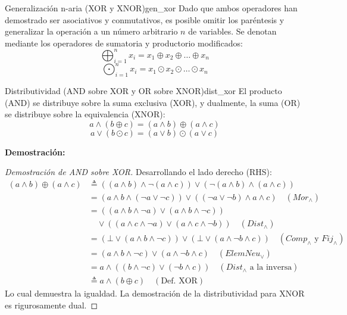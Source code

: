 \documentclass[12pt,a4paper]{article}
\newcommand{\desplegable}[2]{%
  \par\vspace{1ex}\noindent
  \textbf{Demostración:}
  \vspace{1ex}
  
  #2
  \par\vspace{1ex}
}
\begin{document}
\begin{teorema}{Generalización n-aria (XOR y XNOR)}{gen_xor}
Dado que ambos operadores han demostrado ser asociativos y conmutativos, es posible omitir los paréntesis y generalizar la operación a un número arbitrario $n$ de variables. Se denotan mediante los operadores de sumatoria y productorio modificados:
\[ \bigoplus_{i=1}^{n} x_i = x_1 \oplus x_2 \oplus \dots \oplus x_n \]
\[ \bigodot_{i=1}^{n} x_i = x_1 \odot x_2 \odot \dots \odot x_n \]
\end{teorema}

\begin{teorema}{Distributividad (AND sobre XOR y OR sobre XNOR)}{dist_xor}
El producto (AND) se distribuye sobre la suma exclusiva (XOR), y dualmente, la suma (OR) se distribuye sobre la equivalencia (XNOR):
\[ a \wedge (b \oplus c) = (a \wedge b) \oplus (a \wedge c) \]
\[ a \vee (b \odot c) = (a \vee b) \odot (a \vee c) \]
\end{teorema}
\desplegable{proof_dist_xor}{
\begin{proof}[Demostración de AND sobre XOR]
Desarrollando el lado derecho (RHS):
\begin{align*}
    (a \wedge b) \oplus (a \wedge c) &\triangleq ((a \wedge b) \wedge \neg(a \wedge c)) \vee (\neg(a \wedge b) \wedge (a \wedge c)) \\
                                     &= (a \wedge b \wedge (\neg a \vee \neg c)) \vee ((\neg a \vee \neg b) \wedge a \wedge c) \quad (Mor_\wedge) \\
                                     &= ((a \wedge b \wedge \neg a) \vee (a \wedge b \wedge \neg c)) \\
                                     &\quad \vee ((a \wedge c \wedge \neg a) \vee (a \wedge c \wedge \neg b)) \quad (Dist_\wedge) \\
                                     &= (\bot \vee (a \wedge b \wedge \neg c)) \vee (\bot \vee (a \wedge \neg b \wedge c)) \quad (Comp_\wedge \text{ y } Fij_\wedge) \\
                                     &= (a \wedge b \wedge \neg c) \vee (a \wedge \neg b \wedge c) \quad (ElemNeu_\vee) \\
                                     &= a \wedge ((b \wedge \neg c) \vee (\neg b \wedge c)) \quad (Dist_\wedge \text{ a la inversa}) \\
                                     &\triangleq a \wedge (b \oplus c) \quad (\text{Def. XOR})
\end{align*}
Lo cual demuestra la igualdad. La demostración de la distributividad para XNOR es rigurosamente dual.
\end{proof}
}
\end{document}
